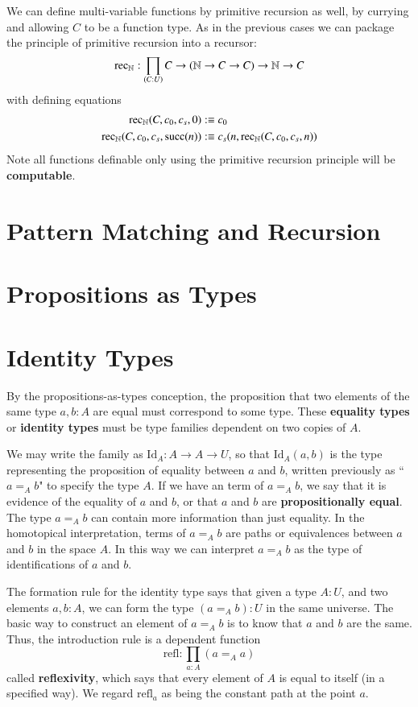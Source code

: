 We can define multi-variable functions by primitive recursion as well, by currying and allowing $C$ to be a function type. As in the previous cases we can package the principle of primitive recursion into a recursor: $$\text{rec}_{\mathbb N}:\prod_{(C:U)}C\rightarrow (\mathbb N\rightarrow C\rightarrow C)\rightarrow \mathbb N\rightarrow C$$
with defining equations \begin{align*}
    \text{rec}_{\mathbb N}(C,c_0,c_s,0) &:\equiv c_0 \\
    \text{rec}_{\mathbb N}(C,c_0,c_s,\text{succ}(n)) &:\equiv c_s(n,\text{rec}_{\mathbb N}(C,c_0,c_s,n))
\end{align*}
Note all functions definable only using the primitive recursion principle will be \textbf{computable}.

\section{Pattern Matching and Recursion}


\section{Propositions as Types}


\section{Identity Types}

By the propositions-as-types conception, the proposition that two elements of the same type $a,b:A$ are equal must correspond to some type. These \textbf{equality types} or \textbf{identity types} must be type families dependent on two copies of $A$.

We may write the family as $\text{Id}_A:A\rightarrow A\rightarrow U$, so that $\text{Id}_A(a,b)$ is the type representing the proposition of equality between $a$ and $b$, written previously as ``$a =_A b$" to specify the type $A$. If we have an term of $a=_Ab$, we say that it is evidence of the equality of $a$ and $b$, or that $a$ and $b$ are \textbf{propositionally equal}. The type $a=_Ab$ can contain more information than just equality. In the homotopical interpretation, terms of $a=_Ab$ are paths or equivalences between $a$ and $b$ in the space $A$. In this way we can interpret $a=_Ab$ as the type of identifications of $a$ and $b$.

The formation rule for the identity type says that given a type $A:U$, and two elements $a,b:A$, we can form the type $(a=_Ab):U$ in the same universe. The basic way to construct an element of $a=_Ab$ is to know that $a$ and $b$ are the same. Thus, the introduction rule is a dependent function $$\text{refl}:\prod_{a:A}(a=_Aa)$$
called \textbf{reflexivity}, which says that every element of $A$ is equal to itself (in a specified way). We regard $\text{refl}_a$ as being the constant path at the point $a$.

